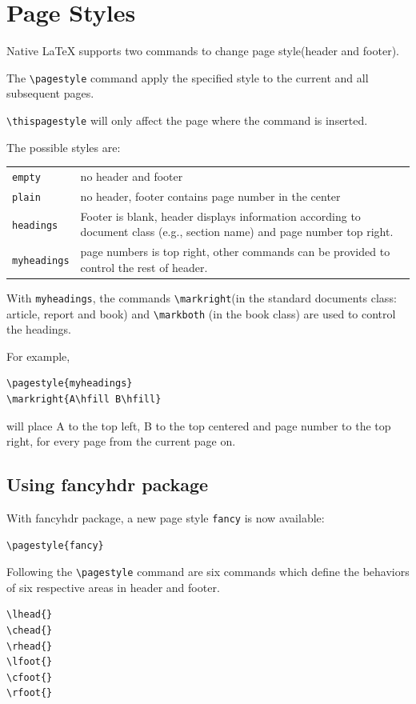 \documentclass[a4paper,oneside]{book}
\begin{document}
\chapter{Page Styles}
Native \LaTeX{} supports two commands to change page style(header and footer).

The \verb|\pagestyle| command apply the specified style to the current and all subsequent pages.

\verb|\thispagestyle| will only affect the page where the command is inserted.

The possible styles are:

\begin{tabular}[h]{lp{8cm}}
  \texttt{empty} & no header and footer\\
  \texttt{plain} & no header, footer contains page number in the center\\
  \texttt{headings} & Footer is blank, header displays information according to document class (e.g., section name) and page number top right.\\
  \texttt{myheadings} & page numbers is top right, other commands can be provided to control the rest of header.
\end{tabular}

With \verb|myheadings|, the commands \verb|\markright|(in the standard documents class: article, report and book) and \verb|\markboth| (in the book class) are used to control the headings.

For example,
\begin{lstlisting}
\pagestyle{myheadings}
\markright{A\hfill B\hfill}
\end{lstlisting}
will place A to the top left, B to the top centered and page number to the top right, for every page from the current page on.

\section{Using \textsf{fancyhdr} package}
With \textsf{fancyhdr} package, a new page style \verb|fancy| is now available:
\begin{lstlisting}
\pagestyle{fancy}
\end{lstlisting}

Following the \verb|\pagestyle| command are six commands which define the behaviors of six respective areas in header and footer. 

\begin{verbatim}
\lhead{}
\chead{}
\rhead{}
\lfoot{}
\cfoot{}
\rfoot{}
\end{verbatim}
\end{document}
